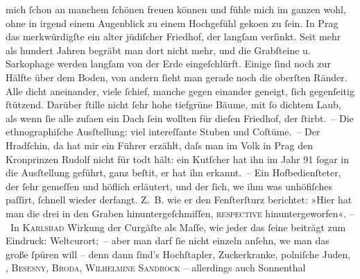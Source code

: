 \begin{ledgroupsized}[t]{13cm}
               mich ſchon an manchem ſchönen freuen können und fühle mich im ganzen wohl, ohne in
               irgend einem Augenblick zu einem Hochgefühl geko{\geminationm}en zu
               ſein. In Prag das merkwürdigſte ein alter jüdiſcher Friedhof, der
               langſam verſinkt. Seit mehr als hundert Jahren begräbt man dort nicht mehr, und die
               Grabſteine u. Sarkophage werden langſam von der Erde eingeſchlürft. Einige ſind noch
               zur Hälfte über dem Boden, von andern ſieht man gerade noch die oberſten Ränder. Alle
               dicht aneinander, viele ſchief, manche gegen einander geneigt, ſich gegenſeitig {\pb}ſtützend. Darüber ſtille nicht ſehr hohe tiefgrüne Bäume,
               mit ſo dichtem Laub, als wenn ſie alle zuſa{\geminationm}en ein Dach
               ſein wollten für dieſen Friedhof, der ſtirbt. – Die ethnographiſche
                  Ausſtellung: viel intereſſante Stuben und Coſtüme. – Der Hradſchin, da hat mir ein Führer erzählt, daſs man im Volk in
                  Prag den Kronprinzen Rudolf nicht für todt hält: ein Kutſcher hat ihn im Jahr
                  91{ }ſogar in die Ausſtellung geführt, ganz beſti{\geminationm}t, er hat ihn erkannt. – Ein Hofbedienſteter, der ſehr
               gemeſſen und höflich erläutert, und der ſich, we{\geminationn} ihm
               was unhöfiſches paſſirt, ſchnell wieder derfangt. Z. B. {\pb}wie er den Fenſterſturz berichtet: »Hier hat man die drei in den Graben
               hinuntergeſchmiſſen, \textsc{reſpective} hinuntergeworfen«.\pend
           \pstart
           – In \textsc{Karlsbad} Wirkung der Curgäſte als Maſſe, wie jeder das ſeine beiträgt zum Eindruck:
               Weltcurort; – aber man darf ſie nicht einzeln anſehn, we{\geminationn} man das große ſpüren will – denn dann ſind’s Hochſtapler, Zuckerkranke, polniſche Juden, \label{K_L00462_1v}\label{K_L00462_1h}, \textsc{Besesny}, \textsc{Broda}, \textsc{Wilhelmine Sandrock} – allerdings auch Sonnenthal

\end{ledgroupsized}
